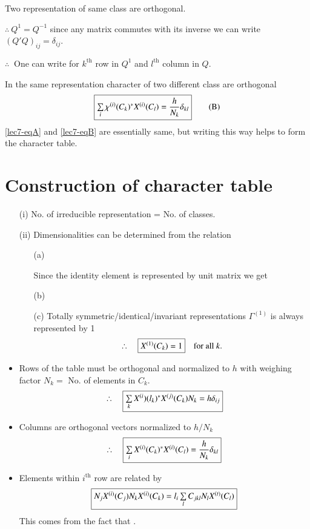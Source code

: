 Two representation of same class are orthogonal.

$\therefore \ Q^{1}=Q^{-1}$ since any matrix commutes with its inverse we can write $(Q'Q)_{ij}=\delta_{ij}$.

$\therefore \ $ One can write for $k^{\text{th}}$ row in $Q^{1}$ and $l^{\text{th}}$ column in $Q$.

In the same representation character of two different class are orthogonal
\begin{equation*}
\fbox{$\sum\limits_{i}\chi^{(i)}(C_{k})^{*}X^{(i)}(C_{l})=\dfrac{h}{N_{k}}\delta_{kl}$}\tag{B}\label{lec7-eqB}
\end{equation*}
\eqref{lec7-eqA} and \eqref{lec7-eqB} are essentially same, but writing this way helps to form the character table.

\section*{Construction of character table}

\begin{itemize}
\item[(i)] No. of irreducible representation = No. of classes.

\item[(ii)] Dimensionalities can be determined from the relation
\begin{itemize}
\item[(a)] 

Since the identity element is represented by unit matrix we get

\item[(b)] 

\item[(c)] Totally symmetric/identical/invariant representations $\Gamma^{(1)}$ is always represented by 1
$$
\therefore\quad \fbox{$X^{(1)}(C_{k})=1$}\quad\text{for all } k.
$$
\end{itemize}

\item Rows of the table must be orthogonal and normalized to $h$ with weighing factor $N_{k}=$ No. of elements in $C_{k}$.
$$
\therefore\quad \fbox{$\sum\limits_{k}X^{(i})(l_{k})^{*}X^{(j)}(C_{k})N_{k}=h\delta_{ij}$}
$$

\item Columns are orthogonal vectors normalized to $h/N_{k}$
$$
\therefore\quad \fbox{$\sum\limits_{i}X^{(i)}(C_{k})^{*}X^{(i)}(C_{l})=\dfrac{h}{N_{k}}\delta_{kl}$}
$$

\item Elements within $i^{\text{th}}$ row are related by
$$
\fbox{$N_{j}X^{(i)}(C_{j})N_{k}X^{(i)}(C_{k})=l_{i}\sum\limits_{l}C_{jkl}N_{l}X^{(t)}(C_{l})$}
$$
This comes from the fact that .
\end{itemize}

